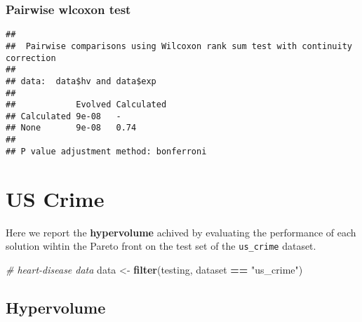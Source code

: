 \documentclass[
]{book}
\newenvironment{Shaded}{\begin{snugshade}}{\end{snugshade}}
\newcommand{\AttributeTok}[1]{\textcolor[rgb]{0.13,0.29,0.53}{#1}}
\newcommand{\CommentTok}[1]{\textcolor[rgb]{0.56,0.35,0.01}{\textit{#1}}}
\newcommand{\ConstantTok}[1]{\textcolor[rgb]{0.56,0.35,0.01}{#1}}
\newcommand{\FunctionTok}[1]{\textcolor[rgb]{0.13,0.29,0.53}{\textbf{#1}}}
\newcommand{\NormalTok}[1]{#1}
\newcommand{\OtherTok}[1]{\textcolor[rgb]{0.56,0.35,0.01}{#1}}
\newcommand{\SpecialCharTok}[1]{\textcolor[rgb]{0.81,0.36,0.00}{\textbf{#1}}}
\newcommand{\StringTok}[1]{\textcolor[rgb]{0.31,0.60,0.02}{#1}}
\begin{document}
\hypertarget{pairwise-wlcoxon-test-4}{%
\subsection{Pairwise wlcoxon test}\label{pairwise-wlcoxon-test-4}}

\begin{Shaded}
\end{Shaded}

\begin{verbatim}
## 
##  Pairwise comparisons using Wilcoxon rank sum test with continuity correction 
## 
## data:  data$hv and data$exp 
## 
##            Evolved Calculated
## Calculated 9e-08   -         
## None       9e-08   0.74      
## 
## P value adjustment method: bonferroni
\end{verbatim}

\hypertarget{us-crime}{%
\chapter{US Crime}\label{us-crime}}

Here we report the \textbf{hypervolume} achived by evaluating the performance of each solution wihtin the Pareto front on the test set of the \texttt{us\_crime} dataset.

\begin{Shaded}
\begin{Highlighting}[]
\CommentTok{\# heart{-}disease data}
\NormalTok{data }\OtherTok{\textless{}{-}} \FunctionTok{filter}\NormalTok{(testing, dataset }\SpecialCharTok{==} \StringTok{"us\_crime"}\NormalTok{)}
\end{Highlighting}
\end{Shaded}

\hypertarget{hypervolume-5}{%
\section{Hypervolume}\label{hypervolume-5}}
\end{document}
